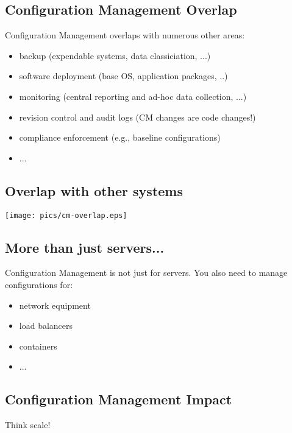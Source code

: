 \documentclass[xga]{xdvislides}
\begin{document}
\subsection{Configuration Management Overlap}
Configuration Management overlaps with numerous other
areas:

\begin{itemize}
	\item backup (expendable systems, data classiciation, ...)
	\item software deployment (base OS, application packages, ..)
	\item monitoring (central reporting and ad-hoc data collection, ...)
	\item revision control and audit logs (CM changes are code changes!)
	\item compliance enforcement (e.g., baseline configurations)
	\item ...
\end{itemize}

\subsection{Overlap with other systems}
\vspace*{\fill}
\begin{center}
	\texttt{[image: pics/cm-overlap.eps]} \\
\end{center}
\vspace*{\fill}

\subsection{More than just servers...}
Configuration Management is not just for servers.  You
also need to manage configurations for:
\vspace{.25in}

\begin{itemize}
	\item network equipment
	\item load balancers
	\item containers
	\item ...
\end{itemize}

\subsection{Configuration Management Impact}
Think scale!
\end{document}
